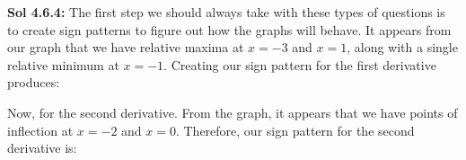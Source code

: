 \begin{tcolorbox}[solution]
    \textbf{Sol 4.6.4: } The first step we should always take with these types of questions is to create sign patterns to figure out how the graphs will behave. It appears from our graph that we have relative maxima at $x = -3$ and $x = 1$, along with a single relative minimum at $x = -1$. Creating our sign pattern for the first derivative produces: \\
    \begin{center}
    \end{center} \vspace{11pt}
    Now, for the second derivative. From the graph, it appears that we have points of inflection at $x = -2$ and $x = 0$. Therefore, our sign pattern for the second derivative is: \\
    \begin{center}
\end{center}
\end{tcolorbox}

